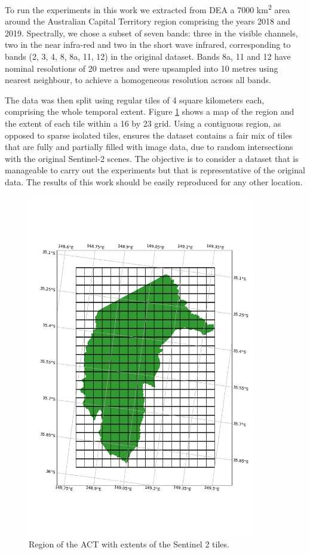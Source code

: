 \documentclass[essd, manuscript]{copernicus}
\begin{document}
To run the experiments in this work we extracted from DEA a 7000 km\textsuperscript{2} area around the Australian Capital Territory region comprising the years 2018 and 2019. Spectrally, we chose a subset of seven bands: three in the visible channels, two in the near infra-red and two in the short wave infrared, corresponding to bands (2, 3, 4, 8, 8a, 11, 12) in the original dataset. Bands 8a, 11 and 12 have nominal resolutions of 20 metres and were upsampled into 10 metres using nearest neighbour, to achieve a homogeneous resolution across all bands.

The data was then split using regular tiles of 4 square kilometers each, comprising the whole temporal extent. Figure \ref{dataset} shows a map of the region and the extent of each tile within a 16 by 23 grid. Using a contiguous region, as opposed to sparse isolated tiles, ensures the dataset contains a fair mix of tiles that are fully and partially filled with image data, due to random intersections with the original Sentinel-2 scenes. The objective is to consider a dataset that is manageable to carry out the experiments but that is representative of the original data. The results of this work should be easily reproduced for any other location.

\begin{figure}%
    \includegraphics[width=10cm]{fig1.png}
    \caption{Region of the ACT with extents of the Sentinel 2 tiles.}%
    \label{dataset}%
\end{figure}
\end{document}
